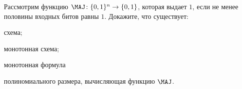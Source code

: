 Рассмотрим функцию $\MAJ\colon \{0, 1\}^n \rightarrow \{0, 1\}$, которая выдает $1$, если не менее половины
входных битов равны $1$. Докажите, что существует:
\begin{enumcyr}
    \item схема;
    \item монотонная схема;
    \item монотонная формула
\end{enumcyr}
полиномиального размера, вычисляющая функцию $\MAJ$.
